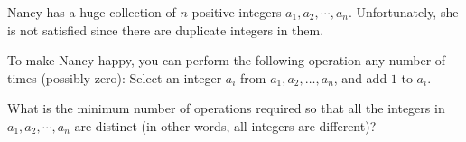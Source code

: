 Nancy has a huge collection of $n$ positive integers $a_1,a_2,\cdots,a_n$. Unfortunately, she is not satisfied since there are duplicate integers in them.

To make Nancy happy, you can perform the following operation any number of times (possibly zero): Select an integer $a_i$ from $a_1,a_2,\ldots,a_n$, and add $1$ to $a_i$. 

What is the minimum number of operations required so that all the integers in $a_1,a_2,\cdots,a_n$ are distinct (in other words, all integers are different)?